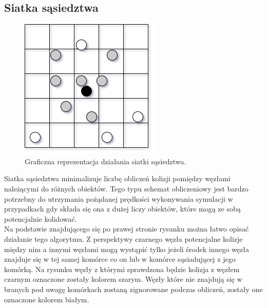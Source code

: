 \documentclass[12pt, letterpaper]{report}
\begin{document}
    \clearpage
    \subsection{Siatka sąsiedztwa}

    \begin{figure}
        \includegraphics[width=0.99\linewidth]{neib_grid.drawio}
        \caption{
            Graficzna reprezentacja działania siatki sąsiedztwa.
        }
    \end{figure}

    Siatka sąsiedztwa minimalizuje liczbę obliczeń kolizji pomiędzy węzłami 
    należącymi do różnych obiektów. Tego typu schemat obliczeniowy jest 
    bardzo potrzebny do utrzymania 
    pożądanej prędkości wykonywania symulacji w przypadkach gdy składa się ona 
    z dużej liczy obiektów, które mogą ze sobą potencjalnie kolidować. \\
    
    Na podstawie znajdującego się po prawej stronie rysunku można łatwo opisać
    działanie tego algorytmu. Z perspektywy czarnego węzła
    potencjalne kolizje między nim a innymi węzłami mogą wystąpić tylko 
    jeżeli środek innego węzła znajduje się w tej 
    samej komórce co on lub w komórce sąsiadującej z jego komórką. Na rysunku 
    węzły z którymi sprawdzona będzie kolizja z węzłem czarnym oznaczone zostały
    kolorem szarym. Węzły które nie znajdują się w branych pod uwagę komórkach 
    zostaną zignorowane podczas obliczeń, zostały one oznaczone kolorem białym. \\
\end{document}
